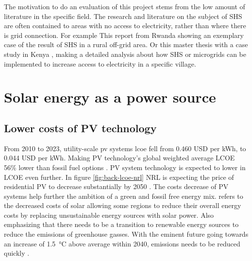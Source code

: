 The motivation to do an evaluation of this project stems from the low amount of literature in the specific field. The research and literature on the subject of SHS are often contained to areas with no access to electricity, rather than where there is grid connection. For example This report from Rwanda \citep{asifGrameenShaktiExemplary2012} showing an exemplary case of the result of SHS in a rural off-grid area. Or this master thesis with a case study in Kenya \citep{gulbrandsenAssessingWhetherConnection2021}, making a detailed analysis about how SHS or microgrids can be implemented to increase access to electricity in a specific village.  


\section{Solar energy as a power source}
\label{ch:back:sec:solar}
\subsection{Lower costs of PV technology}
From 2010 to 2023, utility-scale \acrfull{pv} systems \acrfull{lcoe} fell from 0.460 USD per kWh, to 0.044 USD per kWh. Making PV technology's global weighted average LCOE 56\% lower than fossil fuel options 
 \citep{irena_renewable_2024}. PV system technology is expected to lower in LCOE even further. In figure \ref{fig:back-lcoe-nrl} NRL is expecting the price of residential PV to decrease substantially by 2050 \citep{nrlResidentialPV2024}. The costs decrease of PV systems help further the ambition of a green and fossil free energy mix. \citep{calvinIPCC2023Climate2023} refers to the decreased costs of solar allowing some regions to reduce their overall energy costs by replacing unsustainable energy sources with solar power. Also emphasizing that there needs to be a transition to renewable energy sources to reduce the emissions of greenhouse gasses. With the eminent future going towards an increase of \SI{1.5}{\celsius} above average within 2040, emissions needs to be reduced quickly \citep{calvinIPCC2023Climate2023}. 

